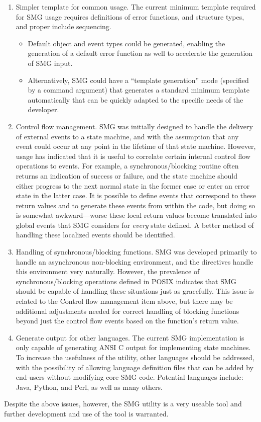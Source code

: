 \documentclass[runningheads]{llncs}
\begin{document}
\begin{enumerate}
\item Simpler template for common usage.  The current minimum template
  required for SMG usage requires definitions of error functions,
  \SMOBJ and \SMEVT structure types, and proper include sequencing.
  \begin{itemize}
  \item Default object and event types could be generated, enabling
    the generation of a default error function as well to accelerate
    the generation of SMG input.
  \item Alternatively, SMG could have a ``template generation'' mode
    (specified by a command argument) that generates a standard
    minimum template automatically that can be quickly adapted to the
    specific needs of the developer.
  \end{itemize}
  
\item Control flow management.  SMG was initially designed to handle
  the delivery of external events to a state machine, and with the
  assumption that any event could occur at any point in the lifetime
  of that state machine.  However, usage has indicated that it is
  useful to correlate certain internal control flow operations to
  events.  For example, a synchronous/blocking routine often returns
  an indication of success or failure, and the state machine should
  either progress to the next normal state in the former case or enter
  an error state in the latter case.  It is possible to define events
  that correspond to these return values and to generate these events
  from within the code, but doing so is somewhat awkward---worse these
  local return values become translated into global events that SMG
  considers for {\em every} state defined.  A better method of
  handling these localized events should be identified.
  
\item Handling of synchronous/blocking functions.  SMG was developed
  primarily to handle an asynchronous non-blocking environment, and
  the directives handle this environment very naturally.  However, the
  prevalence of synchronous/blocking operations defined in POSIX
  indicates that SMG should be capable of handling these situations
  just as gracefully.  This issue is related to the Control flow
  management item above, but there may be additional adjustments
  needed for correct handling of blocking functions beyond just the
  control flow events based on the function's return value.
  
\item Generate output for other languages.  The current SMG
  implementation is only capable of generating ANSI C output for
  implementing state machines.  To increase the usefulness of the
  utility, other languages should be addressed, with the possibility
  of allowing language definition files that can be added by end-users
  without modifying core SMG code.  Potential languages include: Java,
  Python, and Perl, as well as many others.

\end{enumerate}

Despite the above issues, however, the SMG utility is a very useable
tool and further development and use of the tool is warranted.
\end{document}
